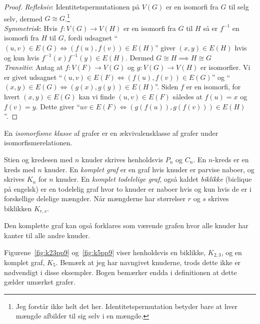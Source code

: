 \begin{proof}
	\textit{Refleksiv}: Identitetspermutationen på $V(G)$ er en isomorfi fra $G$ til selg selv, dermed $G \cong G$.\footnote{Jeg forstår ikke helt det her. Identitetspermutation betyder bare at hver mængde afbilder til sig selv i en mængde.} \\
	\noindent
	\textit{Symmetrisk}: Hvis $f : V(G) \rightarrow V(H)$ er en isomorfi fra $G$ til $H$ så er $f^{-1}$ en isomorfi fra $H$ til $G$, fordi udsagnet ``$(u,v) \in E(G) \iff (f(u),f(v)) \in E(H)$'' giver $(x,y) \in E(H)$ hvis og kun hvis $f^{-1}(x)f^{-1}(y) \in E(H)$. Dermed $G \cong H \implies H \cong G$\\
	\noindent
	\textit{Transitiv}: Antag at $f : V(F) \rightarrow V(G)$ og $g : V(G) \rightarrow V(H)$ er isomorfier. Vi er givet udsagnet ``$(u,v) \in E(F) \iff (f(u), f(v)) \in E(G)$'' og ``$(x,y) \in E(G) \iff (g(x),g(y)) \in E(H)$''. Siden $f$ er en isomorfi, for hvert $(x,y) \in E(G)$ kan vi finde $(u,v) \in E(F)$ således at $f(u) = x$ og $f(v) = y$. Dette giver ``$uv \in E(F) \iff (g(f(u)),g(f(v))) \in E(H)$''.
\end{proof}



\begin{definition}
	En \textit{isomorfisme klasse} af grafer er en ækvivalensklasse af grafer under isomorfismerelationen.
\end{definition}


\begin{definition}
	Stien og kredesen med $n$ knuder skrives henholdsvis $P_{n}$ og $C_{n}$. En $n$-kreds er en kreds med $n$ knuder. En \textit{komplet graf} er en graf hvis knuder er parvise naboer, og skrives $K_{n}$ for $n$ knuder. En \textit{komplet todelelige graf}, også kaldet \textit{biklikke} (biclique på engelsk) er en todelelig graf hvor to knuder er naboer hvis og kun hvis de er i forskellige delelige mængder. Når mængderne har størrelser $r$ og $s$ skrives biklikken $K_{r,s}$.
\end{definition}

Den komplette graf kan også forklares som værende grafen hvor alle knuder har kanter til alle andre knuder.

Figurene~\ref{fig:k23pp9} og~\ref{fig:k5pp9} viser henholdsvis en biklikke, $K_{2,3}$, og en komplet graf, $K_{5}$. Bemærk at jeg har navngivet knuderne, trods dette ikke er nødvendigt i disse eksempler. Bogen bemærker endda i definitionen at dette gælder umærket grafer.



